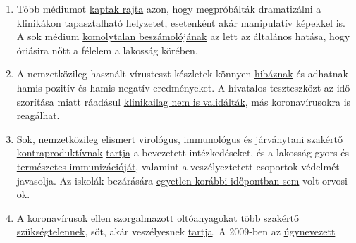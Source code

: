 \begin{enumerate}
{  Államokban} sok klinika kihasználtsága nagyon
  \href{https://www.spiegel.de/wirtschaft/unternehmen/trotz-corona-pandemie-warum-kliniken-jetzt-kurzarbeit-anmelden-a-3dc61bc9-fb12-4298-8022-bb4c2be39d7d}{alacsony}
  maradt, sőt, részben át kellett térniük a
  \href{https://www.20min.ch/schweiz/news/story/Spitaeler-28949526}{rövidített
  munkaidőre}. Sok műtétet és kezelést
  \href{https://www.zeit.de/2020/18/kliniken-coronavirus-intensivbetten-patienten-behandlung-notaufnahme}{lemondtak},
  köztük „nem halaszthatatlan`` szerv-átültetéseket és rákvizsgálatokat.
\item
  Több médiumot
  \href{https://nypost.com/2020/04/01/cbs-admits-to-using-footage-from-italy-in-report-about-nyc/}{kaptak
  rajta} azon, hogy megpróbálták dramatizálni a klinikákon tapasztalható
  helyzetet, esetenként akár manipulatív képekkel is. A sok médium
  \href{https://onlinelibrary.wiley.com/doi/full/10.1111/eci.13222}{komolytalan
  beszámolójának} az lett az általános hatása, hogy óriásira nőtt a
  félelem a lakosság körében.
\item
  A nemzetközileg használt vírusteszt-készletek könnyen
  \href{https://www.ncbi.nlm.nih.gov/pubmed/32219885}{hibáznak} és
  adhatnak hamis pozitív és hamis negatív eredményeket. A hivatalos
  teszteszközt az idő szorítása miatt ráadásul
  \href{https://www.youtube.com/watch?v=p_AyuhbnPOI}{klinikailag nem is
  validálták}, más koronavírusokra is reagálhat.
\item
  Sok, nemzetközileg elismert virológus, immunológus és járványtani
  \href{https://www.rubikon.news/artikel/120-expertenstimmen-zu-corona}{szakértő}
  \href{https://off-guardian.org/2020/03/28/10-more-experts-criticising-the-coronavirus-panic/}{kontraproduktívnak}
  \href{https://off-guardian.org/2020/03/24/12-experts-questioning-the-coronavirus-panic/}{tartja}
  a bevezetett intézkedéseket, és a lakosság gyors és
  \href{https://off-guardian.org/2020/04/17/8-more-experts-questioning-the-coronavirus-panic/}{természetes
  immunizációját}, valamint a veszélyeztetett csoportok védelmét
  javasolja. Az iskolák bezárására
  \href{https://www.thelancet.com/journals/lanchi/article/PIIS2352-4642(20)30095-X/fulltext}{egyetlen
  korábbi időpontban sem} volt orvosi ok.
\item
  A koronavírusok ellen szorgalmazott oltóanyagokat több szakértő
  \href{https://www.youtube.com/watch?v=vrL9QKGQrWk}{szükségtelennek},
  sőt, akár veszélyesnek
  \href{https://www.nature.com/articles/d41586-020-00751-9}{tartja}. A
  2009-ben az
  \href{https://www.forbes.com/2010/02/05/world-health-organization-swine-flu-pandemic-opinions-contributors-michael-fumento.html}{úgynevezett
}
\end{enumerate}
